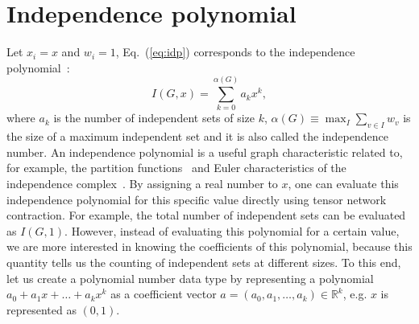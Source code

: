 \documentclass[onefignum, onetabnum]{siamart190516}
\newcommand{\<}{\langle}
\renewcommand{\>}{\rangle}
\newcommand{\Eq}[1]{Eq.~(\ref{#1})}
\newcommand{\blue}[1]{[{\bf  \color{blue}{JG: #1}}]}
\newcommand{\purple}[1]{[{\bf  \color{purple}{MC: #1}}]}
\newcounter{example}
\begin{document}
\section{Independence polynomial}\label{sec:indpoly}
Let $x_i = x$ and $w_i = 1$, \Eq{eq:idp} corresponds to the independence polynomial~\cite{Harvey2018,Ferrin2014}:
\begin{equation}\label{eq:idpdef}
I(G, x) = \sum_{k=0}^{\alpha(G)} a_k x^k,
\end{equation}
where $a_k$ is the number of independent sets of size $k$, $\alpha(G) \equiv \max_{I}\sum_{v\in I}w_v$ is the size of a maximum independent set and it is also called the independence number.
An independence polynomial is a useful graph characteristic related to, for example, the partition functions~\cite{Lee1952,Yang1952} and Euler characteristics of the independence complex~\cite{Bousquet2008, Levit2009}.
By assigning a real number to $x$, one can evaluate this independence polynomial for this specific value directly using tensor network contraction.
For example, the total number of independent sets can be evaluated as $I(G, 1)$.
However, instead of evaluating this polynomial for a certain value, we are more interested in knowing the coefficients of this polynomial, because this quantity tells us the counting of independent sets at different sizes.
To this end, let us create a polynomial number data type by representing a polynomial $a_0 + a_1 x + \ldots + a_k x^k$ as a coefficient vector $a = (a_0, a_1, \ldots, a_k) \in \mathbb{R}^k$, e.g. $x$ is represented as $(0, 1)$.
\end{document}

